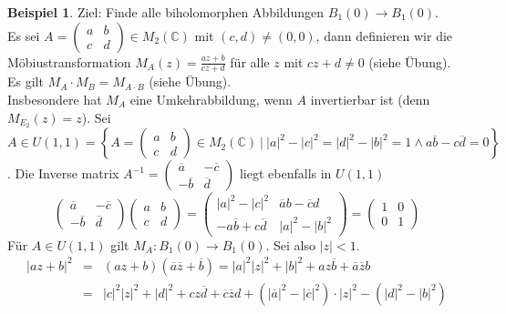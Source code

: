 \documentclass[11pt,titlepage]{article}
\theoremstyle{definition}
\newtheorem{example}[theorem]{Beispiel}
\theoremstyle{remark}
\begin{document}
	\begin{example} \label{exp:moebius}
		Ziel: Finde alle biholomorphen Abbildungen $B_1(0)\to B_1(0)$. \\Es sei $A=\left(
		\begin{smallmatrix} a&b \\ c&d \end{smallmatrix}\right)\in M_2 (\mathbb{C})$ mit 
		$(c,d)\neq (0,0)$, dann definieren wir die Möbiustransformation 
		$M_A (z)=\frac{az+b}{cz+d}$ für alle $z$ mit $cz+d \neq 0$ (siehe Übung). \\
		Es gilt $M_A \cdot M_B =M_{A\cdot B}$ (siehe Übung). \\
		Insbesondere hat $M_A$ eine Umkehrabbildung, wenn $A$ invertierbar ist (denn 
		$M_{E_2}(z)=z$). Sei $A\in U(1,1)=\left\{ A=\left(\begin{smallmatrix} a&b\\c&d \end{smallmatrix}
		\right)\in M_2 (\mathbb{C})\  \vert\  |a|^2 -|c|^2 =|d|^2 -|b|^2 =1 \land a\overline{b}-c\overline{d}=0 
		\right\}$. Die Inverse matrix $A^{-1} =\left( \begin{smallmatrix} \overline{a}&-\overline{c} \\
		-\overline{b}&\overline{d} \end{smallmatrix}\right)$ liegt ebenfalls in $U(1,1)$
		\[ \begin{pmatrix} \overline{a}&-\overline{c} \\
		 -\overline{b}&\overline{d} \end{pmatrix}
		\begin{pmatrix} a&b \\
		c&d \end{pmatrix}
		=\begin{pmatrix}|a|^2 -|c|^2 & \overline{a}b-\overline{c}d \\
		-a\overline{b}+c\overline{d} & |a|^2 -|b|^2 \end{pmatrix}
		=\begin{pmatrix} 1&0\\0&1 \end{pmatrix} \]
		Für $A\in U(1,1)$ gilt $M_A :B_1(0)\to B_1(0)$. Sei also $|z|<1$. 
		\begin{eqnarray*}
			|az+b|^2 &=& (az+b)(\overline{a}\overline{z}+\overline{b})=|a|^2 |z|^2 +|b|^2 +az\overline{b}
			+\overline{a}\overline{z}b \\
			&=& |c|^2|z|^2 +|d|^2 +cz\overline{d} +\overline{c}\overline{z}d+(|\overline{a}|^2 -
			|\overline{c}|^2)\cdot |z|^2 -(|d|^2 -|b|^2) \\

\end{eqnarray*}
\end{example}
\end{document}
